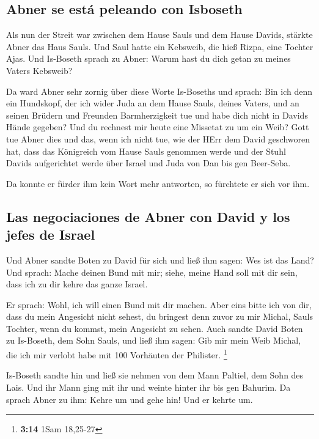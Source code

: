 \hypertarget{abner-se-estuxe1-peleando-con-isboseth}{%
\subsection{Abner se está peleando con
Isboseth}\label{abner-se-estuxe1-peleando-con-isboseth}}

 Als nun der Streit war zwischen dem Hause Sauls und dem
Hause Davids, stärkte Abner das Haus Sauls.  Und Saul
hatte ein Kebsweib, die hieß Rizpa, eine Tochter Ajas. Und Is-Boseth
sprach zu Abner: Warum hast du dich getan zu meines Vaters Kebsweib?

 Da ward Abner sehr zornig über diese Worte Is-Boseths und
sprach: Bin ich denn ein Hundskopf, der ich wider Juda an dem Hause
Sauls, deines Vaters, und an seinen Brüdern und Freunden Barmherzigkeit
tue und habe dich nicht in Davids Hände gegeben? Und du rechnest mir
heute eine Missetat zu um ein Weib?  Gott tue Abner dies
und das, wenn ich nicht tue, wie der HErr dem David geschworen hat,
 dass das Königreich vom Hause Sauls genommen werde und
der Stuhl Davids aufgerichtet werde über Israel und Juda von Dan bis gen
Beer-Seba.

 Da konnte er fürder ihm kein Wort mehr antworten, so
fürchtete er sich vor ihm.

\hypertarget{las-negociaciones-de-abner-con-david-y-los-jefes-de-israel}{%
\subsection{Las negociaciones de Abner con David y los jefes de
Israel}\label{las-negociaciones-de-abner-con-david-y-los-jefes-de-israel}}

 Und Abner sandte Boten zu David für sich und ließ ihm
sagen: Wes ist das Land? Und sprach: Mache deinen Bund mit mir; siehe,
meine Hand soll mit dir sein, dass ich zu dir kehre das ganze Israel.

 Er sprach: Wohl, ich will einen Bund mit dir machen.
Aber eins bitte ich von dir, dass du mein Angesicht nicht sehest, du
bringest denn zuvor zu mir Michal, Sauls Tochter, wenn du kommst, mein
Angesicht zu sehen.  Auch sandte David Boten zu
Is-Boseth, dem Sohn Sauls, und ließ ihm sagen: Gib mir mein Weib Michal,
die ich mir verlobt habe mit 100 Vorhäuten der Philister. \footnote{\textbf{3:14}
  1Sam 18,25-27}

 Is-Boseth sandte hin und ließ sie nehmen von dem Mann
Paltiel, dem Sohn des Lais.  Und ihr Mann ging mit ihr
und weinte hinter ihr bis gen Bahurim. Da sprach Abner zu ihm: Kehre um
und gehe hin! Und er kehrte um.

